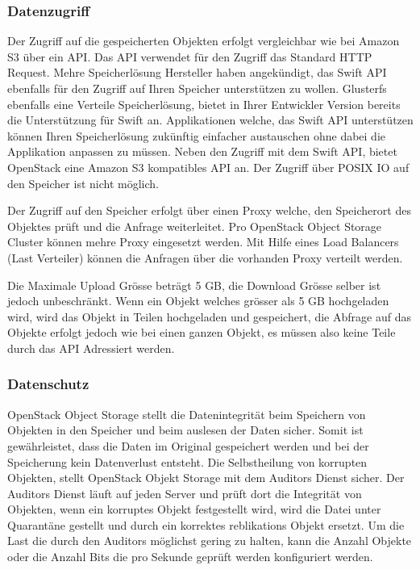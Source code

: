 \subsubsection*{Datenzugriff}
Der Zugriff auf die gespeicherten Objekten erfolgt vergleichbar wie bei Amazon S3 über ein API. Das API verwendet für den Zugriff das Standard HTTP Request. Mehre Speicherlösung Hersteller haben angekündigt, das Swift API ebenfalls für den Zugriff auf Ihren Speicher unterstützen zu wollen. Glusterfs ebenfalls eine Verteile Speicherlösung, bietet in Ihrer Entwickler Version bereits die Unterstützung für Swift an. Applikationen welche, das Swift API unterstützen können Ihren Speicherlösung zukünftig einfacher austauschen ohne dabei die Applikation anpassen zu müssen. Neben den Zugriff mit dem Swift API, bietet OpenStack eine Amazon S3 kompatibles API an. Der Zugriff über POSIX IO auf den Speicher ist nicht möglich.

Der Zugriff auf den Speicher erfolgt über einen Proxy welche, den Speicherort des Objektes prüft und die Anfrage weiterleitet. Pro OpenStack Object Storage Cluster können mehre Proxy eingesetzt werden. Mit Hilfe eines Load Balancers (Last Verteiler) können die Anfragen über die vorhanden Proxy verteilt werden.

Die Maximale Upload Grösse beträgt 5 GB, die Download Grösse selber ist jedoch unbeschränkt. Wenn ein Objekt welches grösser als 5 GB hochgeladen wird, wird das Objekt in Teilen hochgeladen und gespeichert, die Abfrage auf das Objekte erfolgt jedoch wie bei einen ganzen Objekt, es müssen also keine Teile durch das API Adressiert werden. \cite{OpenStack2012a}


\subsubsection*{Datenschutz}
OpenStack Object Storage stellt die Datenintegrität beim Speichern von Objekten in den Speicher und beim auslesen der Daten sicher. Somit ist gewährleistet, dass die Daten im Original gespeichert werden und bei der Speicherung kein Datenverlust entsteht. Die Selbstheilung von korrupten Objekten, stellt OpenStack Objekt Storage mit dem Auditors Dienst sicher. Der Auditors Dienst läuft auf jeden Server und prüft dort die Integrität von Objekten, wenn ein korruptes Objekt festgestellt wird, wird die Datei unter Quarantäne gestellt und durch ein korrektes reblikations Objekt ersetzt.
Um die Last die durch den Auditors möglichst gering zu halten, kann die Anzahl Objekte oder die Anzahl Bits die pro Sekunde geprüft werden konfiguriert werden. \cite{OpenStack2012}


